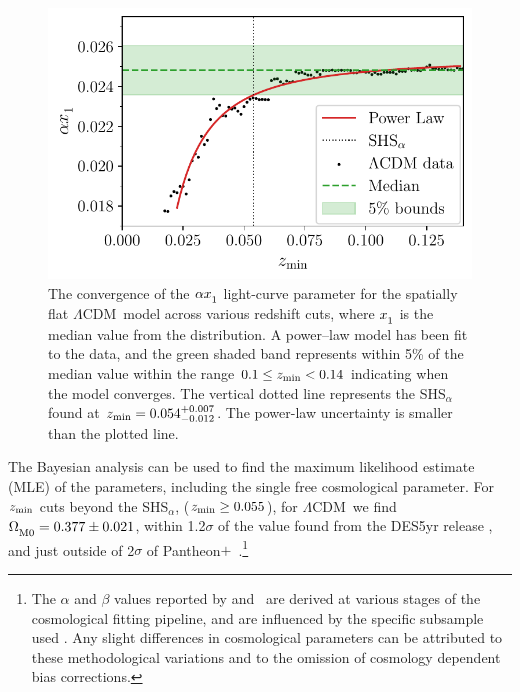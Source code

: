 \documentclass[fleqn,usenatbib,onecolumn,referee]{mnras}
\newcommand{\pplus}{Pantheon$+$}
\newcommand{\LA}{\Lambda}
\newcommand{\LCDM}{$\LA$CDM}
\newcommand{\lcdm}{spatially flat $\LA$CDM}
\newcommand{\laneetal}{\citet{Lane_2023}}
\newcommand{\Z}[1]{_{\lower2pt\hbox{$\scriptstyle#1$}}}
\newcommand{\Ns}[1]{_{\lower2pt\hbox{$\scriptstyle\rm#1$}}}
\newcommand{\ns}[1]{_{\rm #1}}
\newcommand{\zmin}{z\ns{min}}
\begin{document}
\begin{figure}
    \includegraphics[width=\columnwidth]{images/power_law_shs_std.pdf}
    \caption{The convergence of the $\alpha x\Z 1$ light-curve parameter for the \lcdm\ model across various redshift cuts, where $x \Z 1$ is the median value from the distribution. A power--law model has been fit to the data, and the green shaded band represents within 5\% of the median value within the range $0.1 \leq \zmin < 0.14$ indicating when the model converges. The vertical dotted line represents the SHS$_\alpha$ found at $\zmin = 0.054^{+0.007}_{-0.012}$. The power-law uncertainty is smaller than the plotted line.}
    \label{fig:shs}
\end{figure}

The Bayesian analysis can be used to find the maximum likelihood estimate (MLE) of the parameters, including the single free cosmological parameter. For $\zmin$ cuts beyond the SHS$_\alpha$, ($\zmin \geq 0.055$), for \LCDM\ we find $\Omega\Ns{M0}= 0.377 \pm 0.021$, within 1.2$\sigma$ of the value found from the DES5yr release \citep{DES_2024}, and just outside of 2$\sigma$ of \pplus\ \citep{Brout_2022_cosmo}.\footnote{The $\alpha$ and $\beta$ values reported by \citet{Scolnic_2022} and \laneetal\ are derived at various stages of the cosmological fitting pipeline, and are influenced by the specific subsample used \citep{Lane_2023}. Any slight differences in cosmological parameters can be attributed to these methodological variations and to the omission of cosmology dependent bias corrections.}
\end{document}
